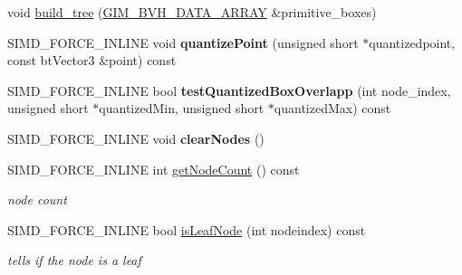 \textbf{ }\par
\begin{DoxyCompactItemize}
\item 
void \hyperlink{classbtQuantizedBvhTree_aa2229fd3e3e2004cdf8151437535e936}{build\+\_\+tree} (\hyperlink{classGIM__BVH__DATA__ARRAY}{G\+I\+M\+\_\+\+B\+V\+H\+\_\+\+D\+A\+T\+A\+\_\+\+A\+R\+R\+AY} \&primitive\+\_\+boxes)
\item 
\mbox{\label{classbtQuantizedBvhTree_a2a262cccd5861d760d366a0c5ba3be65}} 
S\+I\+M\+D\+\_\+\+F\+O\+R\+C\+E\+\_\+\+I\+N\+L\+I\+NE void {\bfseries quantize\+Point} (unsigned short $\ast$quantizedpoint, const bt\+Vector3 \&point) const
\item 
\mbox{\label{classbtQuantizedBvhTree_aa6444b908504b9fc203b128caf0d38d5}} 
S\+I\+M\+D\+\_\+\+F\+O\+R\+C\+E\+\_\+\+I\+N\+L\+I\+NE bool {\bfseries test\+Quantized\+Box\+Overlapp} (int node\+\_\+index, unsigned short $\ast$quantized\+Min, unsigned short $\ast$quantized\+Max) const
\item 
\mbox{\label{classbtQuantizedBvhTree_a893b44b85db31fc25346bcd20659bf64}} 
S\+I\+M\+D\+\_\+\+F\+O\+R\+C\+E\+\_\+\+I\+N\+L\+I\+NE void {\bfseries clear\+Nodes} ()
\item 
\mbox{\label{classbtQuantizedBvhTree_ad7a4d4402d47e0c7dadda291e5a0f969}} 
S\+I\+M\+D\+\_\+\+F\+O\+R\+C\+E\+\_\+\+I\+N\+L\+I\+NE int \hyperlink{classbtQuantizedBvhTree_ad7a4d4402d47e0c7dadda291e5a0f969}{get\+Node\+Count} () const
\begin{DoxyCompactList}\small\item\em node count \end{DoxyCompactList}\item 
\mbox{\label{classbtQuantizedBvhTree_a0bd0a4504cc0b61551234c411637fcf0}} 
S\+I\+M\+D\+\_\+\+F\+O\+R\+C\+E\+\_\+\+I\+N\+L\+I\+NE bool \hyperlink{classbtQuantizedBvhTree_a0bd0a4504cc0b61551234c411637fcf0}{is\+Leaf\+Node} (int nodeindex) const
\begin{DoxyCompactList}\small\item\em tells if the node is a leaf \end{DoxyCompactList}\item 
\mbox{\label{classbtQuantizedBvhTree_aaca56e08e7846d74142ae87581f1890f}} 

\end{DoxyCompactItemize}
